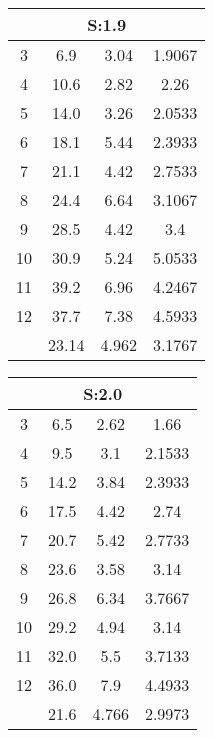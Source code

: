 	\begin{table}[H]
		\begin{tabular}{c|ccc}
			\multicolumn{4}{c}{S:1.9}\\\hline
			3 & 6.9 & 3.04 & 1.9067\\
			4 & 10.6 & 2.82 & 2.26\\
			5 & 14.0 & 3.26 & 2.0533\\
			6 & 18.1 & 5.44 & 2.3933\\
			7 & 21.1 & 4.42 & 2.7533\\
			8 & 24.4 & 6.64 & 3.1067\\
			9 & 28.5 & 4.42 & 3.4\\
			10 & 30.9 & 5.24 & 5.0533\\
			11 & 39.2 & 6.96 & 4.2467\\
			12 & 37.7 & 7.38 & 4.5933\\
			\hline
			& 23.14 & 4.962 & 3.1767\\
		\end{tabular}
	\end{table}
	\begin{table}[H]
		\begin{tabular}{c|ccc}
			\multicolumn{4}{c}{S:2.0}\\\hline
			3 & 6.5 & 2.62 & 1.66\\
			4 & 9.5 & 3.1 & 2.1533\\
			5 & 14.2 & 3.84 & 2.3933\\
			6 & 17.5 & 4.42 & 2.74\\
			7 & 20.7 & 5.42 & 2.7733\\
			8 & 23.6 & 3.58 & 3.14\\
			9 & 26.8 & 6.34 & 3.7667\\
			10 & 29.2 & 4.94 & 3.14\\
			11 & 32.0 & 5.5 & 3.7133\\
			12 & 36.0 & 7.9 & 4.4933\\
			\hline
			& 21.6 & 4.766 & 2.9973\\
		\end{tabular}
	\end{table}
	
